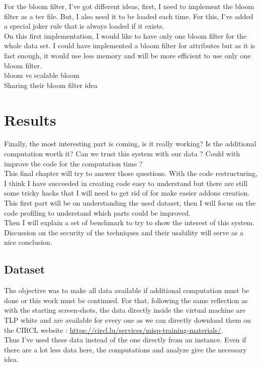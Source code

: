 \documentclass{eplmastersthesis}
\begin{document}
For the bloom filter, I've got different ideas, first, I need to implement the bloom filter as a tsv file. But, I also need it to be loaded each time. For this, I've added a special joker rule that is always loaded if it exists.\\
On this first implementation, I would like to have only one bloom filter for the whole data set. I could have implemented a bloom filter for attributes but as it is fast enough, it would use less memory and will be more efficient to use only one bloom filter.\\

bloom vs scalable bloom \\

Sharing their bloom filter idea \\

\chapter{Results}
Finally, the most interesting part is coming, is it really working? Is the additional computation worth it? Can we trust this system with our data ? Could with improve the code for the computation time ?\\
This final chapter will try to answer those questions. With the code restructuring, I think I have succeeded in creating code easy to understand but there are still some tricky hacks that I will need to get rid of for make easier addons creation.
This first part will be on understanding the used dataset, then I will focus on the code profiling to understand which parts could be improved.\\
Then I will explain a set of benchmark to try to show the interest of this system.\\
Discussion on the security of the techniques and their usability will serve as a nice conclusion.\\

\section{Dataset}
The objective was to make all data available if additional computation must be done or this work must be continued. For that, following the same reflection as with the starting screen-shots, the data directly inside the virtual machine are TLP white and are available for every one as we can directly download them on the CIRCL website : \url{https://circl.lu/services/misp-training-materials/}.\\
Thus I've used these data instead of the one directly from an instance. Even if there are a lot less data here, the computations and analyze give the necessary idea.
\end{document}
